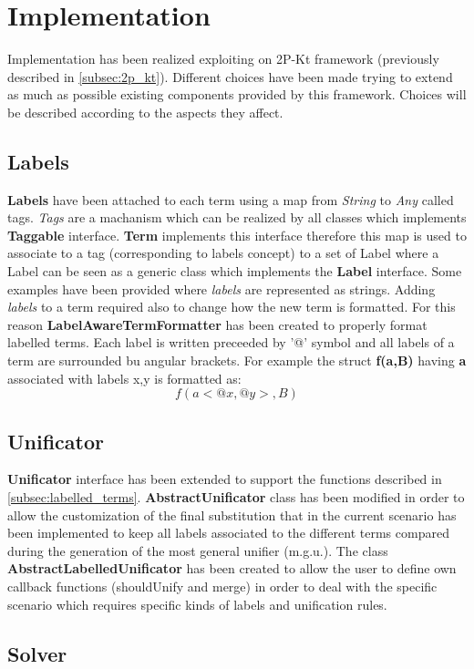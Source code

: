 \section{Implementation}\label{sec:implementation}

Implementation has been realized exploiting on 2P-Kt framework (previously described in \ref{subsec:2p_kt}).
Different choices have been made trying to extend as much as possible existing components provided by this framework.
Choices will be described according to the aspects they affect.

\subsection{Labels}\label{subsec:labels}

\textbf{Labels} have been attached to each term using a map from \textit{String} to \textit{Any} called tags. \textit{Tags}
are a machanism which can be realized by all classes which implements \textbf{Taggable} interface. \textbf{Term} implements
this interface therefore this map is used to associate to a tag (corresponding to labels concept) to a set of Label where a Label can be seen as a generic class
which implements the \textbf{Label} interface. Some examples have been provided where \textit{labels} are represented as strings.\newline
Adding \textit{labels} to a term required also to change how the new term is formatted. For this reason \textbf{LabelAwareTermFormatter} has been created
to properly format labelled terms. Each label is written preceeded by '@' symbol and all labels of a term are surrounded
bu angular brackets.\newline
For example the struct \textbf{f(a,B)} having \textbf{a} associated with labels {x,y} is formatted as:
\[f(a<@x,@y>,B)\]

\subsection{Unificator}\label{subsec:unificator}
\textbf{Unificator} interface has been extended to support the functions described in \ref{subsec:labelled_terms}.
\textbf{AbstractUnificator} class has been modified in order to allow the customization of the final substitution that in the current scenario
has been implemented to keep all labels associated to the different terms compared during the generation of the most general unifier (m.g.u.).\newline
The class \textbf{AbstractLabelledUnificator} has been created to allow the user to define own callback functions (shouldUnify and merge) in order
to deal with the specific scenario which requires specific kinds of labels and unification rules.

\subsection{Solver}\label{subsec:solver}
